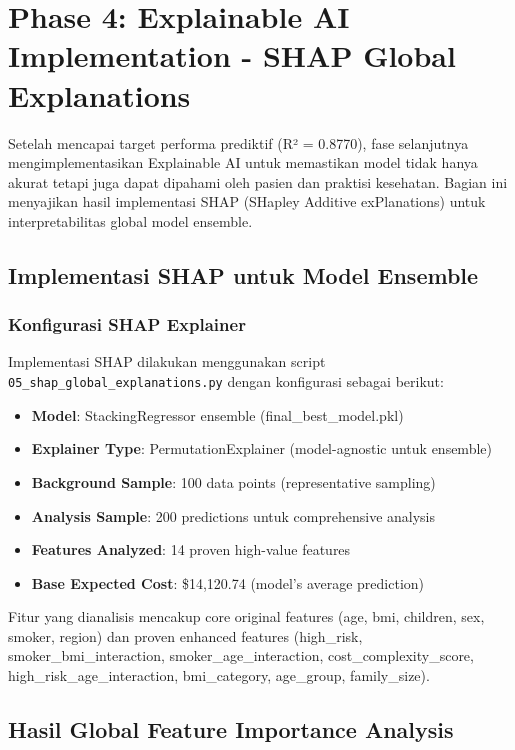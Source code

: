 \section{Phase 4: Explainable AI Implementation - SHAP Global Explanations}
\label{sec:phase4-shap}

Setelah mencapai target performa prediktif (R² = 0.8770), fase selanjutnya mengimplementasikan Explainable AI untuk memastikan model tidak hanya akurat tetapi juga dapat dipahami oleh pasien dan praktisi kesehatan. Bagian ini menyajikan hasil implementasi SHAP (SHapley Additive exPlanations) untuk interpretabilitas global model ensemble.

\subsection{Implementasi SHAP untuk Model Ensemble}
\label{subsec:shap-implementation}

\subsubsection{Konfigurasi SHAP Explainer}

Implementasi SHAP dilakukan menggunakan script \texttt{05\_shap\_global\_explanations.py} dengan konfigurasi sebagai berikut:

\begin{itemize}
    \item \textbf{Model}: StackingRegressor ensemble (final\_best\_model.pkl)
    \item \textbf{Explainer Type}: PermutationExplainer (model-agnostic untuk ensemble)
    \item \textbf{Background Sample}: 100 data points (representative sampling)
    \item \textbf{Analysis Sample}: 200 predictions untuk comprehensive analysis
    \item \textbf{Features Analyzed}: 14 proven high-value features
    \item \textbf{Base Expected Cost}: \$14,120.74 (model's average prediction)
\end{itemize}

Fitur yang dianalisis mencakup core original features (age, bmi, children, sex, smoker, region) dan proven enhanced features (high\_risk, smoker\_bmi\_interaction, smoker\_age\_interaction, cost\_complexity\_score, high\_risk\_age\_interaction, bmi\_category, age\_group, family\_size).

\subsection{Hasil Global Feature Importance Analysis}
\label{subsec:shap-global-importance}

